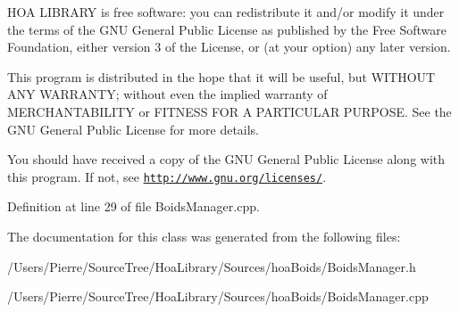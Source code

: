 H\-O\-A L\-I\-B\-R\-A\-R\-Y is free software\-: you can redistribute it and/or modify it under the terms of the G\-N\-U General Public License as published by the Free Software Foundation, either version 3 of the License, or (at your option) any later version.

This program is distributed in the hope that it will be useful, but W\-I\-T\-H\-O\-U\-T A\-N\-Y W\-A\-R\-R\-A\-N\-T\-Y; without even the implied warranty of M\-E\-R\-C\-H\-A\-N\-T\-A\-B\-I\-L\-I\-T\-Y or F\-I\-T\-N\-E\-S\-S F\-O\-R A P\-A\-R\-T\-I\-C\-U\-L\-A\-R P\-U\-R\-P\-O\-S\-E. See the G\-N\-U General Public License for more details.

You should have received a copy of the G\-N\-U General Public License along with this program. If not, see \href{http://www.gnu.org/licenses/}{\tt http\-://www.\-gnu.\-org/licenses/}. 

Definition at line 29 of file Boids\-Manager.\-cpp.



The documentation for this class was generated from the following files\-:\begin{DoxyCompactItemize}
\item 
/\-Users/\-Pierre/\-Source\-Tree/\-Hoa\-Library/\-Sources/hoa\-Boids/Boids\-Manager.\-h\item 
/\-Users/\-Pierre/\-Source\-Tree/\-Hoa\-Library/\-Sources/hoa\-Boids/Boids\-Manager.\-cpp\end{DoxyCompactItemize}
